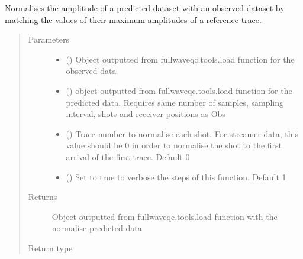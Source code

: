 \documentclass[letterpaper,10pt,english]{sphinxmanual}
\begin{document}
\begin{fulllineitems}
\label{\detokenize{index:fullwaveqc.tools.ampnorm}}
Normalises the amplitude of a predicted dataset with an observed dataset by matching the values of their maximum
amplitudes of a reference trace.
\begin{quote}\begin{description}
\item[{Parameters}] \leavevmode\begin{itemize}
\item {} 
 ({\hyperref[\detokenize{index:fullwaveqc.tools.SegyData}]{}}) \textendash{} Object outputted from fullwaveqc.tools.load function for the observed data

\item {} 
 ({\hyperref[\detokenize{index:fullwaveqc.tools.SegyData}]{}}) \textendash{} object outputted from fullwaveqc.tools.load function for the predicted data.
Requires same number of samples, sampling interval, shots and receiver positions
as Obs

\item {} 
 (\sphinxstyleliteralemphasis{\sphinxupquote{, }}) \textendash{} Trace number to normalise each shot. For streamer data, this value should be
0 in order to normalise the shot to the first arrival of the first trace. Default 0

\item {} 
 (\sphinxstyleliteralemphasis{\sphinxupquote{, }}) \textendash{} Set to true to verbose the steps of this function. Default 1

\end{itemize}

\item[{Returns}] \leavevmode
{} \textendash{} Object outputted from fullwaveqc.tools.load function with the normalise predicted data

\item[{Return type}] \leavevmode
{\hyperref[\detokenize{index:fullwaveqc.tools.SegyData}]{}}

\end{description}\end{quote}

\end{fulllineitems}
\end{document}
